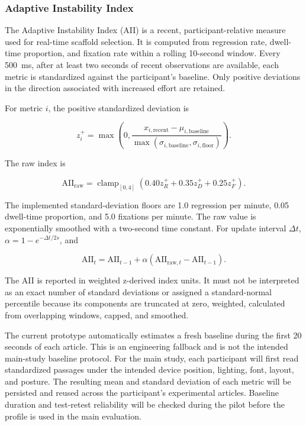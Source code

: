 \subsubsection{Adaptive Instability Index}

The Adaptive Instability Index (AII) is a recent, participant-relative measure
used for real-time scaffold selection. It is computed from regression rate,
dwell-time proportion, and fixation rate within a rolling 10-second window.
Every 500~ms, after at least two seconds of recent observations are available,
each metric is standardized against the participant's baseline. Only positive
deviations in the direction associated with increased effort are retained.

For metric \(i\), the positive standardized deviation is

\begin{equation}
 z_i^{+}=\max\left(0,
 \frac{x_{i,\mathrm{recent}}-\mu_{i,\mathrm{baseline}}}
 {\max(\sigma_{i,\mathrm{baseline}},\sigma_{i,\mathrm{floor}})}
 \right).
\end{equation}

The raw index is

\begin{equation}
 \mathrm{AII}_{\mathrm{raw}}=
 \operatorname{clamp}_{[0,4]}
 \left(0.40z_R^{+}+0.35z_D^{+}+0.25z_F^{+}\right).
\end{equation}

The implemented standard-deviation floors are 1.0 regression per minute, 0.05
dwell-time proportion, and 5.0 fixations per minute. The raw value is
exponentially smoothed with a two-second time constant. For update interval
\(\Delta t\), \(\alpha=1-e^{-\Delta t/2s}\), and

\begin{equation}
 \mathrm{AII}_t=\mathrm{AII}_{t-1}
 +\alpha(\mathrm{AII}_{\mathrm{raw},t}-\mathrm{AII}_{t-1}).
\end{equation}

The AII is reported in weighted z-derived index units. It must not be
interpreted as an exact number of standard deviations or assigned a
standard-normal percentile because its components are truncated at zero,
weighted, calculated from overlapping windows, capped, and smoothed.

The current prototype automatically estimates a fresh baseline during the first
20 seconds of each article. This is an engineering fallback and is not the
intended main-study baseline protocol. For the main study, each participant will
first read standardized passages under the intended device position, lighting,
font, layout, and posture. The resulting mean and standard deviation of each
metric will be persisted and reused across the participant's experimental
articles. Baseline duration and test-retest reliability will be checked during
the pilot before the profile is used in the main evaluation.

